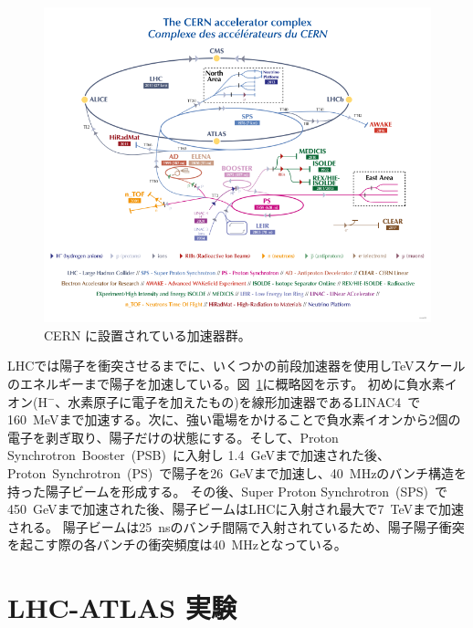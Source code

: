 \begin{figure}[tb]
  \centering
  \includegraphics[clip, width=14cm]{fig/2/CCC-v2022.pdf}
  \caption{CERN に設置されている加速器群\cite{article:accelerator-complex}。}
  \label{fig:LHC加速器}
\end{figure}


LHCでは陽子を衝突させるまでに、いくつかの前段加速器を使用しTeVスケールのエネルギーまで陽子を加速している。図~\ref{fig:LHC加速器}に概略図を示す。
初めに負水素イオン(H$^-$、水素原子に電子を加えたもの)を線形加速器であるLINAC4~\cite{article:Linearaccelerator4}で160~MeVまで加速する。次に、強い電場をかけることで負水素イオンから2個の電子を剥ぎ取り、陽子だけの状態にする。そして、Proton Synchrotron~Booster~(PSB)~\cite{article:TheProtonSynchrotronBooster}に入射し 1.4~GeVまで加速された後、Proton~Synchrotron~(PS)~\cite{article:TheProtonSynchrotron}で陽子を26~GeVまで加速し、40~MHzのバンチ構造を持った陽子ビームを形成する。
その後、Super Proton Synchrotron~(SPS)~\cite{article:TheSuperProtonSynchrotron}で450~GeVまで加速された後、陽子ビームはLHCに入射され最大で7~TeVまで加速される。
陽子ビームは25~nsのバンチ間隔で入射されているため、陽子陽子衝突を起こす際の各バンチの衝突頻度は40~MHzとなっている。



\section{LHC-ATLAS 実験}\label{section2-2}

